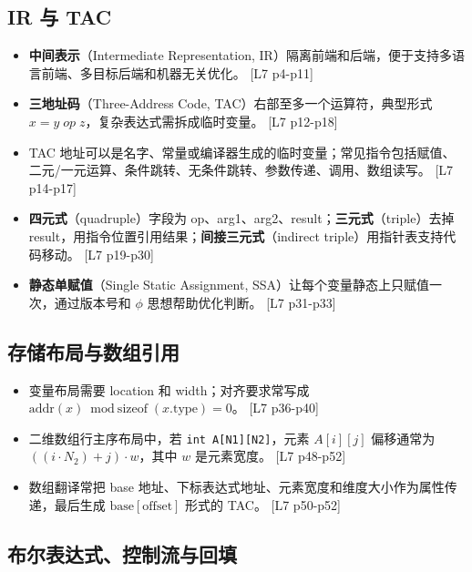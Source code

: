 \documentclass[UTF8,fontset=none,11pt]{ctexart}
\newcommand{\pg}[1]{{\scriptsize\textcolor{citegray}{[#1]}}}
\newcommand{\term}[2]{\textbf{#1}（#2）}
\newcommand{\code}[1]{\texttt{#1}}
\begin{document}
\subsection{IR 与 TAC}

\begin{itemize}
  \item \term{中间表示}{Intermediate Representation, IR}隔离前端和后端，便于支持多语言前端、多目标后端和机器无关优化。 \pg{L7 p4-p11}
  \item \term{三地址码}{Three-Address Code, TAC}右部至多一个运算符，典型形式 \(x=y\;op\;z\)，复杂表达式需拆成临时变量。 \pg{L7 p12-p18}
  \item TAC 地址可以是名字、常量或编译器生成的临时变量；常见指令包括赋值、二元/一元运算、条件跳转、无条件跳转、参数传递、调用、数组读写。 \pg{L7 p14-p17}
  \item \term{四元式}{quadruple}字段为 op、arg1、arg2、result；\term{三元式}{triple}去掉 result，用指令位置引用结果；\term{间接三元式}{indirect triple}用指针表支持代码移动。 \pg{L7 p19-p30}
  \item \term{静态单赋值}{Single Static Assignment, SSA}让每个变量静态上只赋值一次，通过版本号和 \(\phi\) 思想帮助优化判断。 \pg{L7 p31-p33}
\end{itemize}

\subsection{存储布局与数组引用}

\begin{itemize}
  \item 变量布局需要 location 和 width；对齐要求常写成 \(\text{addr}(x)\bmod \text{sizeof}(x.\text{type})=0\)。 \pg{L7 p36-p40}
  \item 二维数组行主序布局中，若 \code{int A[N1][N2]}，元素 \(A[i][j]\) 偏移通常为 \(((i\cdot N_2)+j)\cdot w\)，其中 \(w\) 是元素宽度。 \pg{L7 p48-p52}
  \item 数组翻译常把 base 地址、下标表达式地址、元素宽度和维度大小作为属性传递，最后生成 \(\text{base}[\text{offset}]\) 形式的 TAC。 \pg{L7 p50-p52}
\end{itemize}

\subsection{布尔表达式、控制流与回填}
\end{document}
